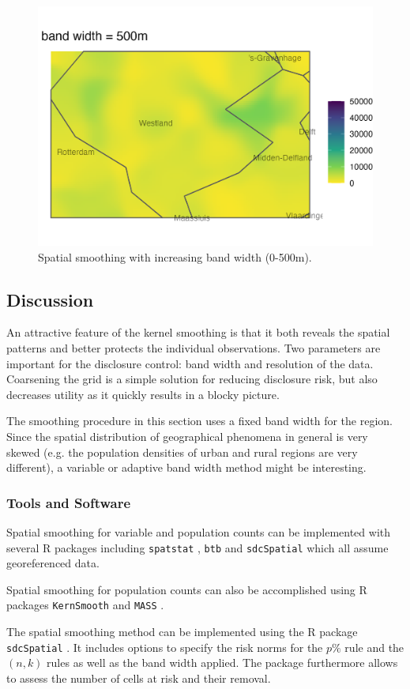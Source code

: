 \begin{figure}[H]
    \includegraphics[width=.49\linewidth]{figures/Smoothing/fixed_smooth_500.png} 
    \caption{Spatial smoothing with increasing band width (0-500m).}
    \label{fig:sm_bandwidth}
\end{figure}

\subsection{Discussion}

An attractive feature of the kernel smoothing is that it both reveals the spatial patterns and better protects the individual observations. 
Two parameters are important for the disclosure control: band width and resolution of the data. Coarsening the grid is a simple solution for reducing disclosure risk, but also decreases utility as it quickly results in a blocky picture. 

The smoothing procedure in this section uses a fixed band width for the region. Since the spatial distribution of geographical phenomena in general is very skewed (e.g. the population densities of urban and rural regions are
very different), a variable or adaptive band width method might be interesting.

\subsubsection{Tools and Software}

Spatial smoothing for variable and population counts can be implemented with several R packages 
including \texttt{spatstat} \citep{spatstat_2005}, \texttt{btb} \citep{btb_2022} and \texttt{sdcSpatial} \citep{sdcSpatial_2022} which all assume georeferenced data. 

Spatial smoothing for population counts can also be accomplished using R packages \texttt{KernSmooth} \citep{kernsmooth_2024} and \texttt{MASS} \citep{mass_2002}.

The spatial smoothing method can be implemented using the R package \texttt{sdcSpatial} \citep{sdcSpatial_2022}. It includes options to specify the risk norms for the $p\%$ rule and the $(n,k)$ rules as well as the band width applied.
The package furthermore allows to assess the number of cells at risk and their removal.

